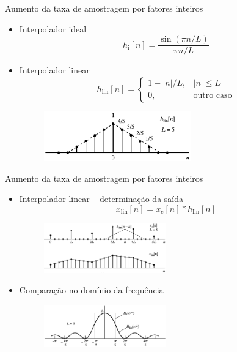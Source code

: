\begin{slide}{Aumento da taxa de amostragem por fatores inteiros }
	\begin{itemize}
		\item Interpolador ideal
			\begin{equation*}
				h_\text{i}[n] = \frac{\sin (\pi n/L)}{\pi n/L}
			\end{equation*}
		\item Interpolador linear
			\begin{equation*}
				h_\text{lin}[n] = \begin{cases} 1-|n|/L, & |n|\leq L\\ 0, & \text{outro caso} \end{cases}
			\end{equation*}
			\begin{figure}
				\centering
				\includegraphics[width=0.6\textwidth]{figs/4-25.eps}
		        \end{figure}
	\end{itemize}
\end{slide}
\begin{slide}{Aumento da taxa de amostragem por fatores inteiros }
	\begin{itemize}
		\item Interpolador linear -- determinação da saída
			\begin{equation*}
				x_\text{lin}[n]=x_e[n]*h_\text{lin}[n]
			\end{equation*}
			\begin{figure}
				\centering
				\includegraphics[width=0.5\textwidth]{figs/4-26a.eps}
		        \end{figure}
		\item Comparação no domínio da frequência 
			\begin{figure}
				\centering
				\includegraphics[width=0.5\textwidth]{figs/4-26b.eps}
		        \end{figure}
	\end{itemize}
\end{slide}
